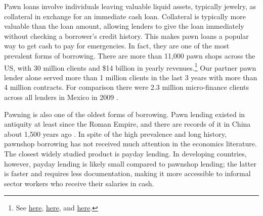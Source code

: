 \documentclass[12pt, a4paper, colorinlistoftodos]{article}
\begin{document}
Pawn loans involve individuals leaving valuable liquid assets, typically jewelry, as collateral in exchange for an immediate cash loan. Collateral is typically more valuable than the loan amount, allowing lenders to give the loan immediately without checking a borrower's credit history. This makes pawn loans a popular way to get cash to pay for emergencies. In fact, they are one of the most prevalent forms of borrowing. There are more than 11,000 pawn shops across the US, with 30 million clients and \$14 billion in yearly revenues.\footnote{See
\href{https://tinyurl.com/ybm56dpe}{here}, \href{https://tinyurl.com/y9zdcgws}{here}, and \href{https://tinyurl.com/y59ptdam}{here}.}
Our partner pawn lender alone served more than 1 million clients in the last 3 years with more than 4 million contracts. For comparison there were 2.3 million micro-finance clients across all lenders in Mexico in 2009 \citep{Pedroza:2010}. 

Pawning is also one of the oldest forms of borrowing. Pawn lending existed in antiquity at least since the Roman Empire, and there are records of it in China about 1,500 years ago \citep{PawnShops}. In spite of the high prevalence and long history, pawnshop borrowing has not received much attention in the economics literature. The closest widely studied product is payday lending. In developing countries, however, payday lending is likely small compared to pawnshop lending; the latter is faster and requires less documentation, making it more accessible to informal sector workers who receive their salaries in cash. %

\end{document}
